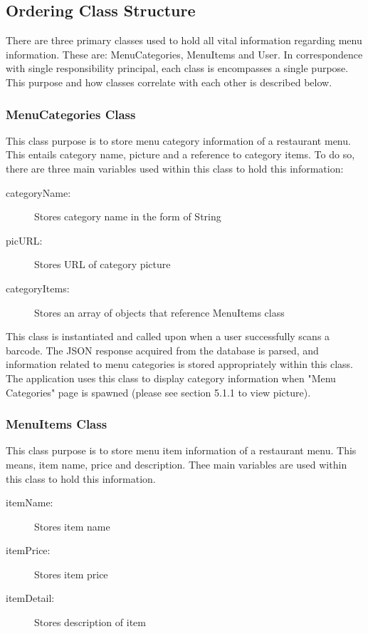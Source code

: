 \documentclass[12pt, titlepage]{article}
\begin{document}
\subsection{Ordering Class Structure}
There are three primary classes used to hold all vital information regarding menu information. These are: MenuCategories, MenuItems and User. In correspondence with single responsibility principal, each class is encompasses a single purpose. This purpose and how classes correlate with each other is described below. 

\subsubsection{MenuCategories Class}
This class purpose is to store menu category information of a restaurant menu. This entails category name, picture and a reference to category items. To do so, there are three main variables used within this class to hold this information: 

\begin{description}
  \item[categoryName:] Stores category name in the form of String
  \item[picURL:] Stores URL of category picture
  \item[categoryItems:] Stores an array of objects that reference MenuItems class
\end{description}


This class is instantiated and called upon when a user successfully scans a barcode. The JSON response acquired from the database is parsed, and information related to menu categories is stored appropriately within this class. The application uses this class to display category information when "Menu Categories" page is spawned (please see section 5.1.1 to view picture).

\subsubsection{MenuItems Class}
This class purpose is to store menu item information of a restaurant menu. This means, item name, price and description. Thee main variables are used within this class to hold this information.

\begin{description}
  \item[itemName:] Stores item name
  \item[itemPrice:] Stores item price
  \item[itemDetail:] Stores description of item
\end{description}
\end{document}
